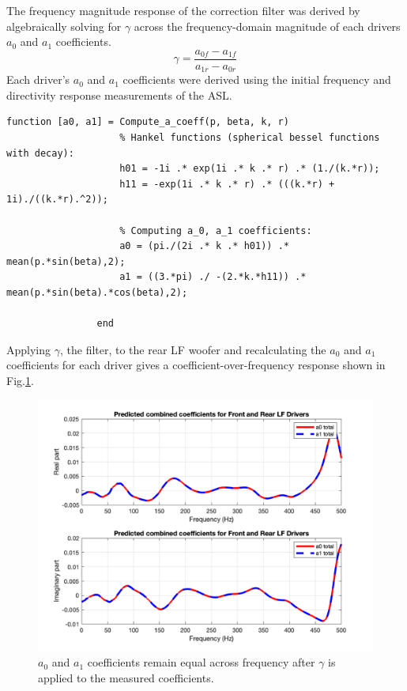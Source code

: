 \documentclass{report}
\begin{document}
            The frequency magnitude response of the correction filter was derived by algebraically solving for $\gamma$ across the frequency-domain magnitude of each drivers $a_0$ and $a_1$ coefficients.
            \begin{equation}
                \gamma = \frac{a_{0f} - a_{1f}}{a_{1r} - a_{0r}}
            \end{equation}
            Each driver's $a_0$ and $a_1$ coefficients were derived using the initial frequency and directivity response measurements of the ASL.
            \begin{lstlisting}[style=Matlab-editor, gobble=16]
                function [a0, a1] = Compute_a_coeff(p, beta, k, r)
                    % Hankel functions (spherical bessel functions with decay):
                    h01 = -1i .* exp(1i .* k .* r) .* (1./(k.*r));
                    h11 = -exp(1i .* k .* r) .* (((k.*r) + 1i)./((k.*r).^2));

                    % Computing a_0, a_1 coefficients:
                    a0 = (pi./(2i .* k .* h01)) .* mean(p.*sin(beta),2);
                    a1 = ((3.*pi) ./ -(2.*k.*h11)) .* mean(p.*sin(beta).*cos(beta),2);
                
                end
            \end{lstlisting}
            Applying $\gamma$, the filter, to the rear LF woofer and recalculating the $a_0$ and $a_1$ coefficients for each driver gives a coefficient-over-frequency response shown in Fig.\ref{coeffsPredicted}.
            \begin{figure}[H]
                \centering
                \includegraphics[scale=0.35]{figs/coeffsPredicted.png}%
                \caption{$a_0$ and $a_1$ coefficients remain equal across frequency after $\gamma$ is applied to the measured coefficients.}
                \label{coeffsPredicted}
            \end{figure}
\end{document}
